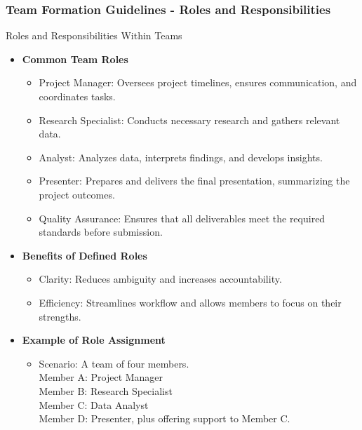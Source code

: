 \documentclass[aspectratio=169]{beamer}
\begin{document}
\begin{frame}[fragile]
    \frametitle{Team Formation Guidelines - Roles and Responsibilities}
    \begin{block}{Roles and Responsibilities Within Teams}
        \begin{itemize}
            \item \textbf{Common Team Roles}
            \begin{itemize}
                \item Project Manager: Oversees project timelines, ensures communication, and coordinates tasks.
                \item Research Specialist: Conducts necessary research and gathers relevant data.
                \item Analyst: Analyzes data, interprets findings, and develops insights.
                \item Presenter: Prepares and delivers the final presentation, summarizing the project outcomes.
                \item Quality Assurance: Ensures that all deliverables meet the required standards before submission.
            \end{itemize}
            \item \textbf{Benefits of Defined Roles}
            \begin{itemize}
                \item Clarity: Reduces ambiguity and increases accountability.
                \item Efficiency: Streamlines workflow and allows members to focus on their strengths.
            \end{itemize}
            \item \textbf{Example of Role Assignment}
            \begin{itemize}
                \item Scenario: A team of four members. \\
                  Member A: Project Manager \\
                  Member B: Research Specialist \\
                  Member C: Data Analyst \\
                  Member D: Presenter, plus offering support to Member C.
            \end{itemize}
        \end{itemize}
    \end{block}
\end{frame}
\end{document}
